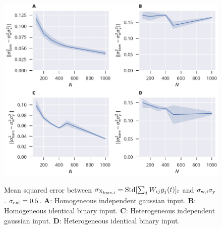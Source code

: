 \documentclass[12pt]{article}
\begin{document}
  \begin{figure}
    \includegraphics[width=5.78in]{./var_predict_composite.pdf}
    \label{fig:rec_mem_var_predict}
    \caption{Mean squared error between $\sigma_{\rm X_{bare,i}} = \mathrm{Std}[\sum_j W_{ij} y_j(t)]_{t}$ and $\sigma_{{\rm w},i}\sigma_{\rm y}$. $\sigma_{\rm ext} = 0.5$.
    {\bf A}: Homogeneous independent gaussian input.
     {\bf B}: Homogeneous identical binary input. 
     {\bf C}: Heterogeneous independent gaussian input. 
     {\bf D}: Heterogeneous identical binary input.}
  \end{figure}
\end{document}

